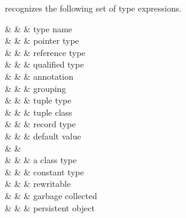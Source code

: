 \Prop{} recognizes the following set of type expressions.  
\begin{syntax}
   & \IS &                 & type name \\
   & \OR & \TypeExp \T{*}              & pointer type \\
   & \OR & \TypeExp \T{\&}             & reference type \\
   & \OR &        & qualified type \\
   & \OR &  \TypeExp       & annotation  \\
   & \OR & \T{(} \TypeExp \T{)}          & grouping \\
   & \OR & \T{(} \TypeExp \T{,} 
       \T{)} & tuple type \\
   & \OR & \T{(} \TypeExp \T{,} 
       \T{)} & tuple class \\
   & \OR & \T{\{}  \T{\}} & record type \\
   & \OR & \TypeExp \T{=}  & default value \\
 & \IS &
   \Id \T{:} \TypeExp \\
   & \IS &        & a class type \\
   & \OR &        & constant type \\
   & \OR &      & rewritable \\
   & \OR &  & garbage collected \\
   & \OR &   & persistent object  \\
\end{syntax}

